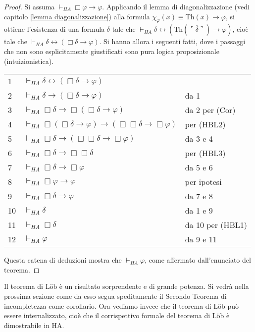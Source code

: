 \begin{proof} Si assuma $\vdash_{HA}\Box\varphi\to\varphi$. Applicando il lemma di diagonalizzazione (vedi capitolo \ref{lemma diagonalizzazione}) alla formula $\chi_{\varphi}(x)\equiv\ensuremath{\mathrm{Th}}(x)\to\varphi$, si ottiene l'esistenza di una formula $\delta$ tale che $\vdash_{HA}\delta\leftrightarrow(\ensuremath{\mathrm{Th}}(\overline{\ulcorner\delta\urcorner})\to\varphi)$, cioè tale che $\vdash_{HA}\delta\leftrightarrow(\Box\delta\to\varphi)$. Si hanno allora i seguenti fatti, dove i passaggi che non sono esplicitamente giustificati sono pura logica proposizionale (intuizionistica).\\

\begin{tabular}{l l l}
1 & $\vdash_{HA}\delta\leftrightarrow(\Box\delta\to\varphi)$ 														& 									 \\
2 & $\vdash_{HA}\delta\to(\Box\delta\to\varphi)$ 														& da 1							 \\
3 & $\vdash_{HA}\Box\delta\to\Box(\Box\delta\to\varphi)$ 										& da 2 per (Cor)		 \\
4 & $\vdash_{HA}\Box(\Box\delta\to\varphi)\to(\Box\Box\delta\to\Box\varphi)$ 		& per (HBL2)				\\
5 & $\vdash_{HA}\Box\delta\to(\Box\Box\delta\to\Box\varphi)$									& da 3 e 4					 \\
6 & $\vdash_{HA}\Box\delta\to\Box\Box\delta$															& per (HBL3)				 \\
7 & $\vdash_{HA}\Box\delta\to\Box\varphi$																	& da 5 e 6					 \\
8 & $\vdash_{HA}\Box\varphi\to\varphi$																		& per ipotesi				 \\
9 & $\vdash_{HA}\Box\delta\to\varphi$																			& da 7 e 8					 \\
10& $\vdash_{HA}\delta$																								& da 1 e 9					 \\
11&	$\vdash_{HA}\Box\delta$																						& da 10 per (HBL1)	\\
12& $\vdash_{HA}\varphi$																								 & da 9 e 11\\					
\end{tabular}

\noindent Questa catena di deduzioni mostra che $\vdash_{HA}\varphi$, come affermato dall'enunciato del teorema.
\end{proof}

Il teorema di L\"ob è un risultato sorprendente e di grande potenza. Si vedrà nella prossima sezione come da esso segua speditamente il Secondo Teorema di incompletezza come corollario. Ora vediamo invece che il teorema di L\"ob può essere internalizzato, cioè che il corrispettivo formale del teorema di L\"ob è dimostrabile in HA.

